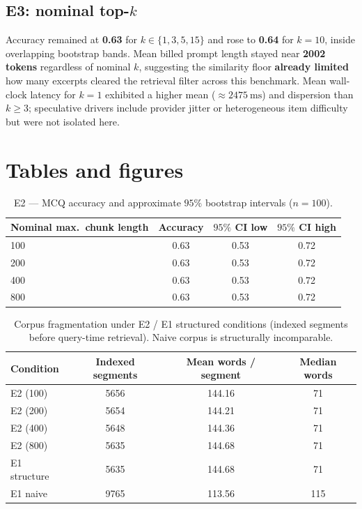 \documentclass[11pt,a4paper]{article}
\begin{document}
\subsection*{E3: nominal top-\(k\)}
Accuracy remained at \textbf{0.63} for \(k \in \{1,3,5,15\}\) and rose to \textbf{0.64} for \(k = 10\), inside overlapping bootstrap bands. Mean billed prompt length stayed near \textbf{2002 tokens} regardless of nominal \(k\), suggesting the similarity floor \textbf{already limited} how many excerpts cleared the retrieval filter across this benchmark. Mean wall-clock latency for \(k=1\) exhibited a higher mean (\(\approx 2475~\mathrm{ms}\)) and dispersion than \(k \geq 3\); speculative drivers include provider jitter or heterogeneous item difficulty but were not isolated here.

\section{Tables and figures}

\begin{table}[t]
  \centering
  \begin{threeparttable}
    \caption{E2 --- MCQ accuracy and approximate \(95\%\) bootstrap intervals (\(n=100\)).}
    \label{tab:e2}
    \begin{tabular}{lccc}
      \toprule
      Nominal max.\ chunk length & Accuracy & \(95\%\) CI low & \(95\%\) CI high \\
      \midrule
      100 & 0.63 & 0.53 & 0.72 \\
      200 & 0.63 & 0.53 & 0.72 \\
      400 & 0.63 & 0.53 & 0.72 \\
      800 & 0.63 & 0.53 & 0.72 \\
      \bottomrule
    \end{tabular}
  \end{threeparttable}
\end{table}

\begin{table}[t]
  \centering
  \begin{threeparttable}
    \caption{Corpus fragmentation under E2 / E1 structured conditions (indexed segments before query-time retrieval). Naive corpus is structurally incomparable.}
    \label{tab:chunks}
    \begin{tabular}{lccc}
      \toprule
      Condition & Indexed segments & Mean words / segment & Median words \\
      \midrule
      E2 (100) & 5656 & 144.16 & 71 \\
      E2 (200) & 5654 & 144.21 & 71 \\
      E2 (400) & 5648 & 144.36 & 71 \\
      E2 (800) & 5635 & 144.68 & 71 \\
      E1 structure & 5635 & 144.68 & 71 \\
      E1 naive & 9765 & 113.56 & 115 \\
      \bottomrule
    \end{tabular}
  \end{threeparttable}
\end{table}
\end{document}
